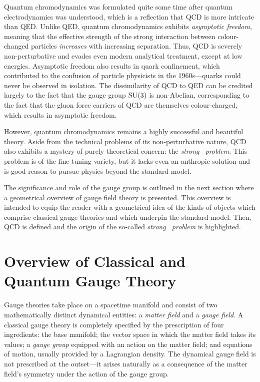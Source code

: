 Quantum chromodynamics was formulated quite some time after quantum electrodynamics was understood, which is a reflection that QCD is more intricate than QED.
Unlike QED, quantum chromodynamics exhibits \emph{asymptotic freedom}, meaning that the effective strength of the strong interaction between colour-changed particles \emph{increases} with increasing separation.
Thus, QCD is severely non-perturbative and evades even modern analytical treatment, except at low energies.
Asymptotic freedom also results in quark confinement, which contributed to the confusion of particle physicists in the 1960s---quarks could never be observed in isolation.
The dissimilarity of QCD to QED can be credited largely to the fact that the gauge group $\mathrm{SU}(3)$ is non-Abelian, corresponding to the fact that the gluon force carriers of QCD are themselves colour-charged, which results in asymptotic freedom.

However, quantum chromodynamics remains a highly successful and beautiful theory.
Aside from the technical problems of its non-perturbative nature, QCD also exhibits a mystery of purely theoretical concern: the \emph{strong \CP\ problem}.
This problem is of the fine-tuning variety, but it lacks even an anthropic solution and is good reason to pursue physics beyond the standard model.


The significance and role of the gauge group is outlined in the next section where a geometrical overview of gauge field theory is presented.
This overview is intended to equip the reader with a geometrical idea of the kinds of objects which comprise classical gauge theories and which underpin the standard model.
Then, QCD is defined and the origin of the so-called \emph{strong \CP\ problem} is highlighted.



\section{Overview of Classical and Quantum Gauge Theory}
\label{sec:overview-of-gauge-theory}

Gauge theories take place on a spacetime manifold and consist of two mathematically distinct dynamical entities: a \emph{matter field} and a \emph{gauge field}.
A classical gauge theory is completely specified by the prescription of four ingredients: the base manifold; the vector space in which the matter field takes its values; a \emph{gauge group} equipped with an action on the matter field; and equations of motion, usually provided by a Lagrangian density.
The dynamical gauge field is not prescribed at the outset---it arises naturally as a consequence of the matter field's symmetry under the action of the gauge group.

